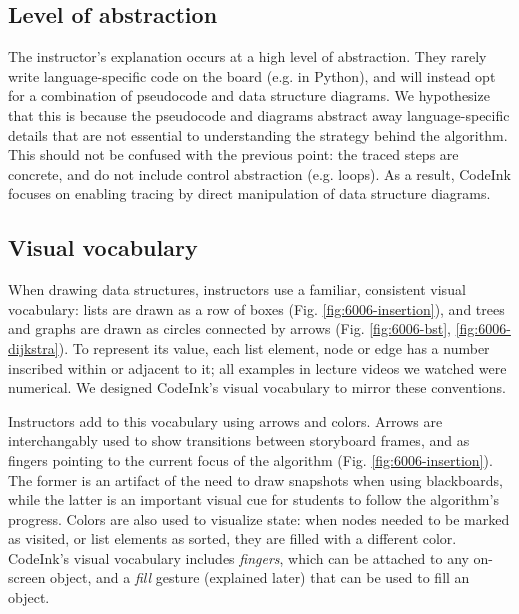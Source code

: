 \subsection{Level of abstraction}
The instructor's explanation occurs at a high level of abstraction.
They rarely write language-specific code on the board (e.g. in Python), and will
instead opt for a combination of pseudocode and data structure diagrams. We
hypothesize that this is because the pseudocode and diagrams abstract away
language-specific details that are not essential to understanding the strategy
behind the algorithm. This should not be confused with the previous point: the
traced steps are concrete, and do not include control abstraction (e.g. loops).
As a result, CodeInk focuses on enabling tracing by direct manipulation of data
structure diagrams.

\subsection{Visual vocabulary}
When drawing data structures, instructors use a familiar, consistent visual
vocabulary:
lists are drawn as a row of boxes (Fig. \ref{fig:6006-insertion}), and trees and
graphs are drawn as circles connected by arrows (Fig.
\ref{fig:6006-bst}, \ref{fig:6006-dijkstra}). To represent its value, each list
element, node or edge has a number inscribed within or adjacent to it; all
examples in lecture videos we watched were numerical. We designed CodeInk's
visual vocabulary to mirror these conventions.

Instructors add to this vocabulary using arrows and colors. Arrows are
interchangably used to show transitions between storyboard frames, and as
fingers pointing to the current focus of the algorithm (Fig.
\ref{fig:6006-insertion}). The former is an artifact of the need to draw
snapshots when using blackboards, while the latter is an important visual cue
for students to follow the algorithm's progress. Colors are also used to
visualize state: when nodes needed to be marked as visited, or list elements as
sorted, they are filled with a different color. CodeInk's visual vocabulary
includes \emph{fingers}, which can be attached to any on-screen object, and a
\emph{fill} gesture (explained later) that can be used to fill an object.

